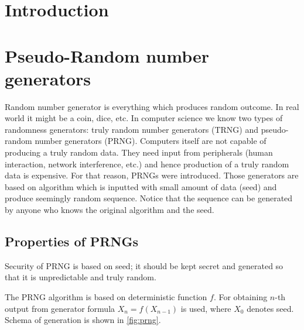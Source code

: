 \documentclass[
    digital,    %
    oneside,    %
    color,
    11pt,
    nocover,
    notable,
    nolof,
    nolot,
    final
]{fithesis3}
\renewcommand\_{\textunderscore\allowbreak}
\begin{document}
\setlength{\parskip}{5pt}
\setlength{\parindent}{0pt}

\newtheorem{theorem}{Theorem}[section] %
                               
\newtheorem{formula}[theorem]{Formula}     %

\chapter{Introduction}
\label{chap:introduction}


\chapter{Pseudo-Random number generators}

Random number generator is everything which produces random outcome. In real world it might be a coin, dice, etc. In computer science we know two types of randomness generators: truly random number generators (TRNG) and pseudo-random number generators (PRNG). Computers itself are not capable of producing a truly random data. They need input from peripherals (human interaction, network interference, etc.) and hence production of a truly random data is expensive. For that reason, PRNGs were introduced. Those generators are based on algorithm which is inputted with small amount of data (seed) and produce seemingly random sequence. Notice that the sequence can be generated by anyone who knows the original algorithm and the seed. \cite{jakobsson2014theory}

\section{Properties of PRNGs}

Security of PRNG is based on seed; it should be kept secret and generated so that it is unpredictable and truly random.

The PRNG algorithm is based on deterministic function $f$. For obtaining $n$-th output from generator formula $X_n = f(X_{n - 1})$ is used, where $X_0$ denotes seed. Schema of generation is shown in \cref{fig:prng}. 
\end{document}
